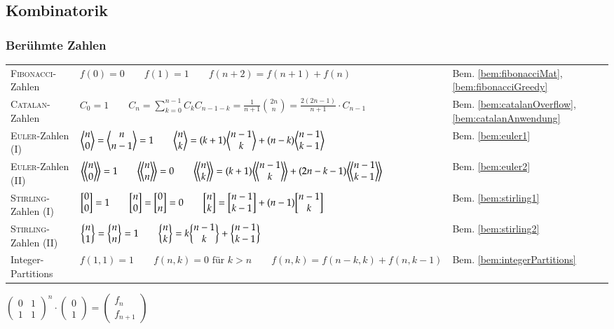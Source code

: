 \subsection{Kombinatorik}

\subsubsection{Berühmte Zahlen}
\begin{tabularx}{\textwidth}{|l|X|l|}
	\hline
	\textsc{Fibonacci}-Zahlen	&
	$f(0) = 0 \qquad
	f(1) = 1 \qquad
	f(n+2) = f(n+1) + f(n)$ &
	Bem. \ref{bem:fibonacciMat}, \ref{bem:fibonacciGreedy} \\

	\textsc{Catalan}-Zahlen	&
	$C_0 = 1 \qquad
	C_n = \sum\limits_{k = 0}^{n - 1} C_kC_{n - 1 - k} = \frac{1}{n + 1}\binom{2n}{n} = \frac{2(2n - 1)}{n+1} \cdot C_{n-1}$ &
	Bem. \ref{bem:catalanOverflow}, \ref{bem:catalanAnwendung} \\

	\textsc{Euler}-Zahlen (I) &
	$\biggl\langle \begin{matrix} n \\ 0 \end{matrix} \biggr\rangle = \biggl\langle \begin{matrix} n \\ n-1 \end{matrix} \biggr\rangle = 1 \qquad
	\biggl\langle \begin{matrix} n \\ k \end{matrix} \biggr\rangle = (k+1) \biggl\langle \begin{matrix} n-1 \\ k \end{matrix} \biggr\rangle + (n-k) \biggl\langle \begin{matrix} n-1 \\ k-1 \end{matrix} \biggr\rangle $ &
	Bem. \ref{bem:euler1} \\

	\textsc{Euler}-Zahlen (II) &
	$\eulerII{n}{0} = 1 \qquad
	\eulerII{n}{n} = 0 \qquad
	\eulerII{n}{k} = (k+1) \eulerII{n-1}{k} + (2n-k-1) \eulerII{n-1}{k-1}$ &
	Bem. \ref{bem:euler2} \\

	\textsc{Stirling}-Zahlen (I) &
	$\biggl[ \begin{matrix} 0 \\ 0 \end{matrix} \biggr] = 1 \qquad
	\biggl[ \begin{matrix} n \\ 0 \end{matrix} \biggr] = \biggl[ \begin{matrix} 0 \\ n \end{matrix} \biggr] = 0 \qquad
	\biggl[ \begin{matrix} n \\ k \end{matrix} \biggr] = \biggl[ \begin{matrix} n-1 \\ k-1 \end{matrix} \biggr] + (n-1) \biggl[ \begin{matrix} n-1 \\ k \end{matrix} \biggr]$ &
	Bem. \ref{bem:stirling1} \\

	\textsc{Stirling}-Zahlen (II) &
	$\biggl\{ \begin{matrix} n \\ 1 \end{matrix} \biggr\} = \biggl\{ \begin{matrix} n \\ n \end{matrix} \biggr\} = 1 \qquad
	\biggl\{ \begin{matrix} n \\ k \end{matrix} \biggr\} = k \biggl\{ \begin{matrix} n-1 \\ k \end{matrix} \biggr\} + \biggl\{ \begin{matrix} n-1 \\ k-1 \end{matrix} \biggr\}$ &
	Bem. \ref{bem:stirling2} \\

	Integer-Partitions &
	$f(1,1) = 1 \qquad f(n,k) = 0 \text{ für } k > n \qquad f(n,k)  = f(n-k,k) + f(n,k-1)$ &
	Bem. \ref{bem:integerPartitions} \\
	\hline
\end{tabularx}

\begin{bem}\label{bem:fibonacciMat}
$
\begin{pmatrix} 0 & 1 \\ 1 & 1 \end{pmatrix}^n
\cdot
\begin{pmatrix} 0 \\ 1 \end{pmatrix}
=
\begin{pmatrix}f_n \\ f_{n+1} \end{pmatrix}
$
\end{bem}

